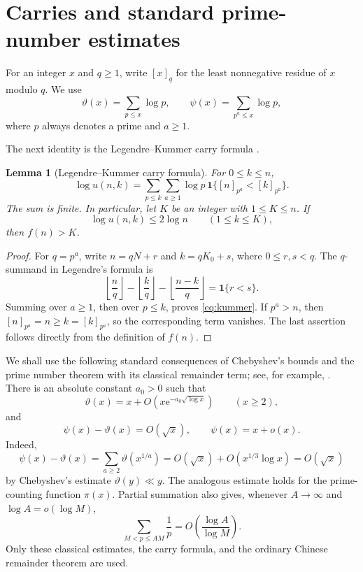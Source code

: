 \documentclass[11pt]{article}
\newtheorem{lemma}[theorem]{Lemma}
\theoremstyle{remark}
\newcommand{\ind}{\mathbf 1}
\newcommand{\e}{\mathrm e}
\begin{document}
\section{Carries and standard prime-number estimates}\label{sec:prelim}

For an integer \(x\) and \(q\geq1\), write \([x]_q\) for the least
nonnegative residue of \(x\) modulo \(q\).  We use
\[
 \vartheta(x)=\sum_{p\leq x}\log p,
 \qquad
 \psi(x)=\sum_{p^a\leq x}\log p,
\]
where \(p\) always denotes a prime and \(a\geq1\).

The next identity is the Legendre--Kummer carry formula
\cite{Kummer1852}.

\begin{lemma}[Legendre--Kummer carry formula]\label{lem:kummer}
For \(0\leq k\leq n\),
\begin{equation}\label{eq:kummer}
 \log u(n,k)
 =\sum_{p\leq k}\sum_{a\geq1}
   \log p\,\ind\{[n]_{p^a}<[k]_{p^a}\}.
\end{equation}
The sum is finite.  In particular, let \(K\) be an integer with
\(1\leq K\leq n\).  If
\begin{equation}\label{eq:criterion}
 \log u(n,k)\leq2\log n\qquad(1\leq k\leq K),
\end{equation}
then \(f(n)>K\).
\end{lemma}

\begin{proof}
For \(q=p^a\), write \(n=qN+r\) and \(k=qK_0+s\), where
\(0\leq r,s<q\).  The \(q\)-summand in Legendre's formula is
\[
 \left\lfloor\frac nq\right\rfloor
 -\left\lfloor\frac kq\right\rfloor
 -\left\lfloor\frac{n-k}{q}\right\rfloor
 =\ind\{r<s\}.
\]
Summing over \(a\geq1\), then over \(p\leq k\), proves
\eqref{eq:kummer}.  If \(p^a>n\), then
\([n]_{p^a}=n\geq k=[k]_{p^a}\), so the corresponding term vanishes.
The last assertion follows directly from the definition of \(f(n)\).
\end{proof}

We shall use the following standard consequences of Chebyshev's bounds and
the prime number theorem with its classical remainder term; see, for example,
\cite[Chapters~I.1 and II.4]{Tenenbaum}.  There is an absolute constant
\(a_0>0\) such that
\begin{equation}\label{eq:pnt-error}
 \vartheta(x)=x+O\!\left(x\e^{-a_0\sqrt{\log x}}\right)
 \qquad(x\geq2),
\end{equation}
and
\begin{equation}\label{eq:psi-theta}
 \psi(x)-\vartheta(x)=O(\sqrt{x}),
 \qquad
 \psi(x)=x+o(x).
\end{equation}
Indeed,
\[
 \psi(x)-\vartheta(x)
 =\sum_{a\geq2}\vartheta(x^{1/a})
 =O(\sqrt{x})+O(x^{1/3}\log x)=O(\sqrt{x})
\]
by Chebyshev's estimate \(\vartheta(y)\ll y\).
The analogous estimate holds for the prime-counting function \(\pi(x)\).
Partial summation also gives, whenever
\(A\to\infty\) and \(\log A=o(\log M)\),
\begin{equation}\label{eq:prime-harmonic}
 \sum_{M<p\leq AM}\frac1p
 =O\!\left(\frac{\log A}{\log M}\right).
\end{equation}
Only these classical estimates, the carry formula, and the ordinary Chinese
remainder theorem are used.
\end{document}
